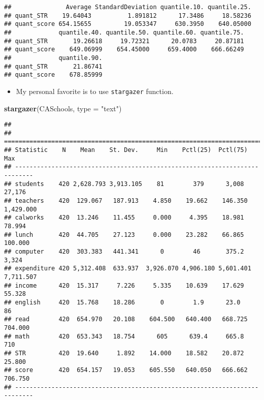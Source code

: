 \documentclass[]{book}
\newenvironment{Shaded}{\begin{snugshade}}{\end{snugshade}}
\newcommand{\KeywordTok}[1]{\textcolor[rgb]{0.13,0.29,0.53}{\textbf{#1}}}
\newcommand{\DataTypeTok}[1]{\textcolor[rgb]{0.13,0.29,0.53}{#1}}
\newcommand{\StringTok}[1]{\textcolor[rgb]{0.31,0.60,0.02}{#1}}
\newcommand{\NormalTok}[1]{#1}
\providecommand{\tightlist}{%
  \setlength{\itemsep}{0pt}\setlength{\parskip}{0pt}}
\begin{document}
\begin{verbatim}
##               Average StandardDeviation quantile.10. quantile.25.
## quant_STR    19.64043          1.891812      17.3486     18.58236
## quant_score 654.15655         19.053347     630.3950    640.05000
##             quantile.40. quantile.50. quantile.60. quantile.75.
## quant_STR       19.26618     19.72321      20.0783     20.87181
## quant_score    649.06999    654.45000     659.4000    666.66249
##             quantile.90.
## quant_STR       21.86741
## quant_score    678.85999
\end{verbatim}

\begin{itemize}
\tightlist
\item
  My personal favorite is to use \texttt{stargazer} function.
\end{itemize}

\begin{Shaded}
\begin{Highlighting}[]
\KeywordTok{stargazer}\NormalTok{(CASchools, }\DataTypeTok{type =} \StringTok{"text"}\NormalTok{)}
\end{Highlighting}
\end{Shaded}

\begin{verbatim}
## 
## ===========================================================================
## Statistic    N    Mean    St. Dev.     Min    Pctl(25)  Pctl(75)     Max   
## ---------------------------------------------------------------------------
## students    420 2,628.793 3,913.105    81        379      3,008    27,176  
## teachers    420  129.067   187.913    4.850    19.662    146.350  1,429.000
## calworks    420  13.246    11.455     0.000     4.395    18.981    78.994  
## lunch       420  44.705    27.123     0.000    23.282    66.865    100.000 
## computer    420  303.383   441.341      0        46       375.2     3,324  
## expenditure 420 5,312.408  633.937  3,926.070 4,906.180 5,601.401 7,711.507
## income      420  15.317     7.226     5.335    10.639    17.629    55.328  
## english     420  15.768    18.286       0        1.9      23.0       86    
## read        420  654.970   20.108    604.500   640.400   668.725   704.000 
## math        420  653.343   18.754      605      639.4     665.8      710   
## STR         420  19.640     1.892    14.000    18.582    20.872    25.800  
## score       420  654.157   19.053    605.550   640.050   666.662   706.750 
## ---------------------------------------------------------------------------
\end{verbatim}
\end{document}
